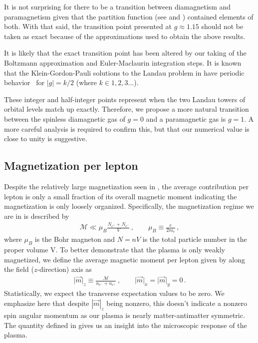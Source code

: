It is not surprising for there to be a transition between diamagnetism and paramagnetism given that the partition function (see  and ) contained elements of both. With that said, the transition point presented at $g\approx1.15$ should not be taken as exact because of the approximations used to obtain the above results. 

It is likely that the exact transition point has been altered by our taking of the Boltzmann approximation and Euler-Maclaurin integration steps. It is known that the Klein-Gordon-Pauli solutions to the Landau problem in  have periodic behavior~\citep{Steinmetz:2018ryf,Evans:2022fsu,Rafelski:2022bsv} for $|g|=k/2$ (where $k\in1,2,3\ldots$).

These integer and half-integer points represent when the two Landau towers of orbital levels match up exactly. Therefore, we propose a more natural transition between the spinless diamagnetic gas of $g=0$ and a paramagnetic gas is $g=1$. A more careful analysis is required to confirm this, but that our numerical value is close to unity is suggestive.

\subsection{Magnetization per lepton}
\label{sec:perlepton}
\noindent Despite the relatively large magnetization seen in , the average contribution per lepton is only a small fraction of its overall magnetic moment indicating the magnetization is only loosely organized. Specifically, the magnetization regime we are in is described by
\begin{align}
 \label{fractionalmagnetization}
 \mathcal{M}\ll\mu_{B}\frac{N_{e^{+}}+N_{e^{-}}}{V}\,,\qquad\mu_{B}\equiv\frac{e}{2m_{e}}\,,
\end{align}
where $\mu_{B}$ is the Bohr magneton and $N=nV$ is the total particle number in the proper volume V. To better demonstrate that the plasma is only weakly magnetized, we define the average magnetic moment per lepton given by along the field ($z$-direction) axis as
\begin{align}
 \label{momentperlepton}
 \vert\vec{m}\vert_{z}\equiv\frac{\mathcal{M}}{n_{e^{-}}+n_{e^{+}}}\,,\qquad\vert\vec{m}\vert_{x}=\vert\vec{m}\vert_{y}=0\,.
\end{align}
Statistically, we expect the transverse expectation values to be zero. We emphasize here that despite $|\vec{m}|_{z}$ being nonzero, this doesn't indicate a nonzero spin angular momentum as our plasma is nearly matter-antimatter symmetric. The quantity defined in  gives us an insight into the microscopic response of the plasma.

